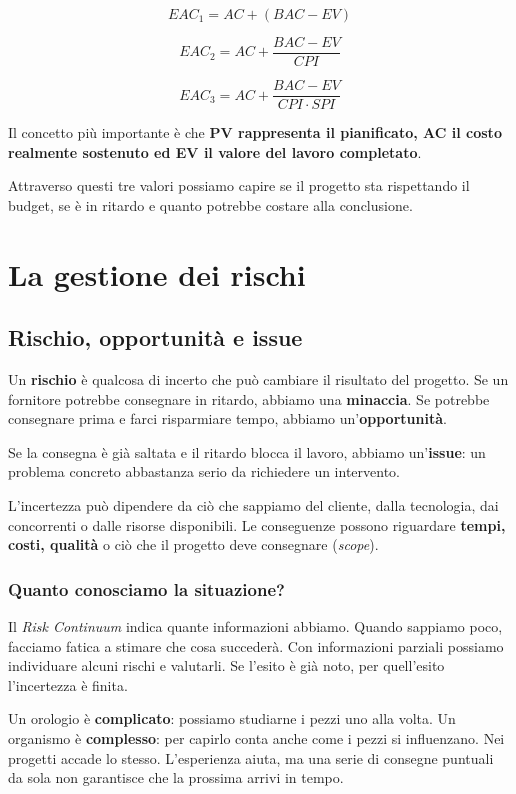 \[
\boxed{
EAC_1=AC+(BAC-EV)
}
\]

\[
\boxed{
EAC_2=AC+\frac{BAC-EV}{CPI}
}
\]

\[
\boxed{
EAC_3=AC+\frac{BAC-EV}{CPI\cdot SPI}
}
\]

\noindent Il concetto più importante
è che \textbf{PV rappresenta il pianificato,
AC il costo realmente sostenuto
ed EV il valore del lavoro completato}.

\noindent Attraverso questi tre valori
possiamo capire se il progetto
sta rispettando il budget,
se è in ritardo e quanto
potrebbe costare alla conclusione.

\section{La gestione dei rischi}

\subsection*{Rischio, opportunità e issue}

\noindent Un \textbf{rischio} è qualcosa di incerto che può cambiare
il risultato del progetto. Se un fornitore potrebbe consegnare in
ritardo, abbiamo una \textbf{minaccia}. Se potrebbe consegnare prima
e farci risparmiare tempo, abbiamo un'\textbf{opportunità}.

\noindent Se la consegna è già saltata e il ritardo blocca il lavoro,
abbiamo un'\textbf{issue}: un problema concreto abbastanza serio da
richiedere un intervento.

\noindent L'incertezza può dipendere da ciò che sappiamo del cliente,
dalla tecnologia, dai concorrenti o dalle risorse disponibili.
Le conseguenze possono riguardare \textbf{tempi, costi, qualità}
o ciò che il progetto deve consegnare (\emph{scope}).

\subsubsection*{Quanto conosciamo la situazione?}

\noindent Il \emph{Risk Continuum} indica quante informazioni abbiamo.
Quando sappiamo poco, facciamo fatica a stimare che cosa succederà.
Con informazioni parziali possiamo individuare alcuni rischi e valutarli.
Se l'esito è già noto, per quell'esito l'incertezza è finita.

\noindent Un orologio è \textbf{complicato}: possiamo studiarne i pezzi
uno alla volta. Un organismo è \textbf{complesso}: per capirlo conta
anche come i pezzi si influenzano. Nei progetti accade lo stesso.
L'esperienza aiuta, ma una serie di consegne puntuali da sola
non garantisce che la prossima arrivi in tempo.

